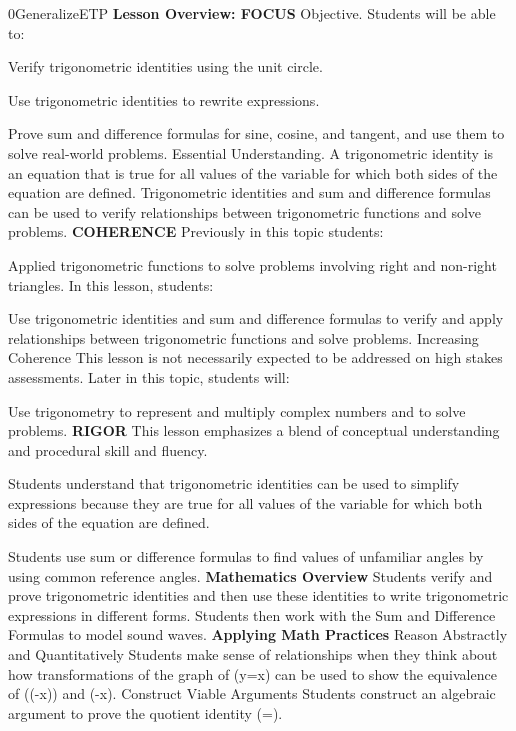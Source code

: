 \documentclass{article}
\newenvironment{te-addendum}[2]{}{}     %
\newcommand{\te}[1]{}                   %
\begin{document}
\begin{te-addendum}{0}{GeneralizeETP}
\textbf{Lesson Overview: FOCUS}
Objective. Students will be able to:
\item Verify trigonometric identities using the unit circle.
\item Use trigonometric identities to rewrite expressions.
\item Prove sum and difference formulas for sine, cosine, and tangent, and use them to solve real-world problems.
Essential Understanding. A trigonometric identity is an equation that is true for all values of the variable for which both sides of the equation are defined. Trigonometric identities and sum and difference formulas can be used to verify relationships between trigonometric functions and solve problems.
\textbf{COHERENCE}
Previously in this topic students:
\item Applied trigonometric functions to solve problems involving right and non-right triangles.
In this lesson, students:
\item Use trigonometric identities and sum and difference formulas to verify and apply relationships between trigonometric functions and solve problems.
Increasing Coherence This lesson is not necessarily expected to be addressed on high stakes assessments.
Later in this topic, students will:
\item Use trigonometry to represent and multiply complex numbers and to solve problems.
\textbf{RIGOR}
This lesson emphasizes a blend of conceptual understanding and procedural skill and fluency.
\item Students understand that trigonometric identities can be used to simplify expressions because they are true for all values of the variable for which both sides of the equation are defined.
\item Students use sum or difference formulas to find values of unfamiliar angles by using common reference angles.
\textbf{Mathematics Overview}
Students verify and prove trigonometric identities and then use these identities to write trigonometric expressions in different forms. Students then work with the Sum and Difference Formulas to model sound waves.
\textbf{Applying Math Practices}
Reason Abstractly and Quantitatively
Students make sense of relationships when they think about how transformations of the graph of (y=\sin x) can be used to show the equivalence of (\sin(-x)) and (-\sin x).
Construct Viable Arguments
Students construct an algebraic argument to prove the quotient identity (\cot\theta=\frac{\cos\theta}{\sin\theta}).
\te{Program Resources. SavvasRealize.com.}
\end{te-addendum}
\end{document}
